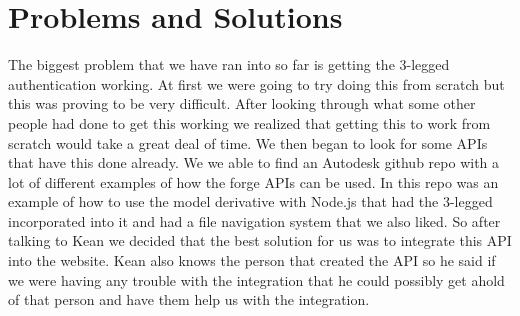 \documentclass[10pt,draftclsnofoot,onecolumn]{IEEEtran}
\begin{document}
\section{Problems and Solutions}
The biggest problem that we have ran into so far is getting the 3-legged authentication working. At first we were going to try doing this from scratch but this was proving to be very difficult. After looking through what some other people had done to get this working we realized that getting this to work from scratch would take a great deal of time. We then began to look for some APIs that have this done already. We we able to find an Autodesk github repo with a lot of different examples of how the forge APIs can be used. In this repo was an example of how to use the model derivative with Node.js that had the 3-legged incorporated into it and had a file navigation system that we also liked. So after talking to Kean we decided that the best solution for us was to integrate this API into the website. Kean also knows the person that created the API so he said if we were having any trouble with the integration that he could possibly get ahold of that person and have them help us with the integration.


\begin{comment}
\section{Retrospective}

\begin{center}
\begin{tabular}{ |p{0.3\linewidth}|p{0.3\linewidth}|p{0.3\linewidth}| } 
 \hline
 \textbf{Positives} & Deltas & Actions \\ 
\hline
After Autodesk University was over our client has become much more available to answer our questions and concerns regarding the project & Planning for future events with the team and making sure there aren't any major conflicts. & The team will communicate questions through emails, and scheduling conflicts will be resolved during client meetings. \\
\hline
  & Better team communication. & This could be accomplished by setting up an in person weekly meeting that happens at the same time every week. \\
\hline 
  & Addressing problems or concerns regrading assignments or documentation. & If everyone in the group is having the same problem and we are not able to come up with a solution we need to ask our TA our one of the professors if they have the answer to the problem we are having. \\ 
 \hline
\end{tabular}
\end{center}
\end{comment}
\end{document}
